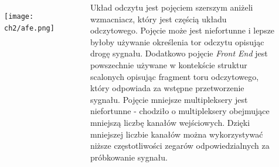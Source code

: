 \begin{frame}[t]
    \begin{block}{\dk}
    \end{block}

    \begin{columns}

        \vspace{-1em}
        \begin{figure}[H]
            \texttt{[image: ch2/afe.png]}
        \end{figure}

    
        {\renewcommand\normalsize{\small}%
\normalsize
Układ odczytu jest pojęciem szerszym aniżeli wzmacniacz, który jest częścią układu odczytowego. Pojęcie może jest niefortunne i lepsze byłoby używanie określenia tor odczytu opisując drogę sygnału. 
Dodatkowo pojęcie \textit{Front End} jest powszechnie używane w kontekście struktur scalonych opisując fragment toru odczytowego, który odpowiada za wstępne przetworzenie sygnału.
Pojęcie mniejsze multipleksery jest niefortunne - chodziło o multipleksery obejmujące mniejszą liczbę kanałów wejściowych. Dzięki mniejszej liczbie kanałów można wykorzystywać niższe częstotliwości zegarów odpowiedzialnych za próbkowanie sygnału.}
    \end{columns}
    
\end{frame}




